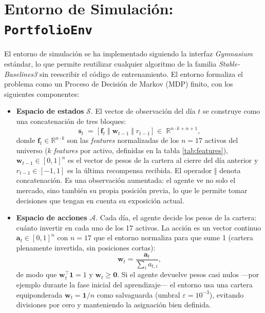 \documentclass[IB,a4paper]{TFUOC}
\begin{document}
\section{Entorno de Simulación: \texttt{PortfolioEnv}}
\label{sec:entorno}

El entorno de simulación se ha implementado siguiendo la interfaz \textit{Gymnasium} estándar, lo que permite reutilizar cualquier algoritmo de la familia \textit{Stable-Baselines3} sin reescribir el código de entrenamiento. El entorno formaliza el problema como un Proceso de Decisión de Markov (MDP) finito, con los siguientes componentes:

\begin{itemize}
    \item \textbf{Espacio de estados} $\mathcal{S}$. El vector de observación del día $t$ se construye como una concatenación de tres bloques:
    \begin{equation}
        \mathbf{s}_t \;=\; \big[\, \mathbf{f}_t \;\Vert\; \mathbf{w}_{t-1} \;\Vert\; r_{t-1} \,\big] \;\in\; \mathbb{R}^{n \cdot k + n + 1},
        \label{eq:state}
    \end{equation}
    donde $\mathbf{f}_t \in \mathbb{R}^{n \cdot k}$ son las \textit{features} normalizadas de los $n = 17$ activos del universo ($k$ \textit{features} por activo, definidas en la tabla \ref{tab:features}), $\mathbf{w}_{t-1} \in [0,1]^{n}$ es el vector de pesos de la cartera al cierre del día anterior y $r_{t-1} \in [-1, 1]$ es la última recompensa recibida. El operador $\Vert$ denota concatenación. Es una observación aumentada: el agente ve no solo el mercado, sino también su propia posición previa, lo que le permite tomar decisiones que tengan en cuenta su exposición actual.
    \item \textbf{Espacio de acciones} $\mathcal{A}$. Cada día, el agente decide los pesos de la cartera: cuánto invertir en cada uno de los 17 activos. La acción es un vector continuo $\mathbf{a}_t \in [0,1]^{n}$ con $n=17$ que el entorno normaliza para que sume 1 (cartera plenamente invertida, sin posiciones cortas):
    \begin{equation*}
        \mathbf{w}_t = \frac{\mathbf{a}_t}{\sum_i a_{t,i}},
    \end{equation*}
    de modo que $\mathbf{w}_t^{\top}\mathbf{1}=1$ y $\mathbf{w}_t \geq \mathbf{0}$. Si el agente devuelve pesos casi nulos ---por ejemplo durante la fase inicial del aprendizaje--- el entorno usa una cartera equiponderada $\mathbf{w}_t = \mathbf{1}/n$ como salvaguarda (umbral $\varepsilon = 10^{-3}$), evitando divisiones por cero y manteniendo la asignación bien definida.


\end{itemize}
\end{document}
